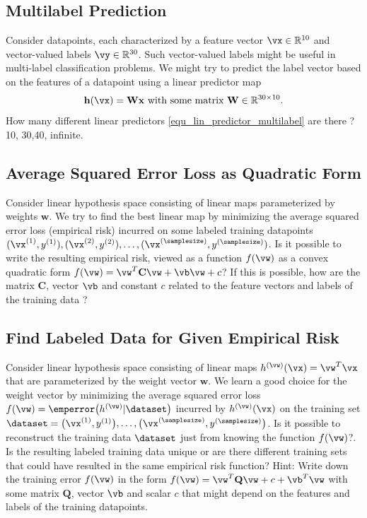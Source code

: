 \documentclass[12pt]{report}
\newcommand{\vh}{\mathbf{h}}
\begin{document}
\subsection{Multilabel Prediction} 
\label{ex_ch2_multilabel}
Consider datapoints, each characterized by a feature vector $\vx \in \mathbb{R}^{10}$ and 
vector-valued labels $\vy \in \mathbb{R}^{30}$. Such vector-valued labels might be useful 
in multi-label classification problems. We might try to predict the label vector based on the 
features of a datapoint using a linear predictor map 
\begin{equation}
\label{equ_lin_predictor_multilabel}
\vh(\vx) = \mathbf{W} \mathbf{x} \mbox{ with some matrix } \mathbf{W} \in \mathbb{R}^{30 \times 10}. 
\end{equation} 
How many different linear predictors \eqref{equ_lin_predictor_multilabel} are there ? 
10, 30,40, infinite. 




\subsection{Average Squared Error Loss as Quadratic Form} 
\label{ex_2_0}
Consider linear hypothesis space consisting of linear maps parameterized by 
weights $\mathbf{w}$. We try to find the best linear map by minimizing the average 
squared error loss (empirical risk) incurred on some labeled training datapoints 
$(\vx^{(1)},y^{(1)}),(\vx^{(2)},y^{(2)}),\ldots,(\vx^{(\samplesize)},y^{(\samplesize)})$.  
Is it possible to write the resulting empirical risk, viewed as a function $f(\vw)$ as 
a convex quadratic form $f(\vw) = \vw^{T} \mathbf{C} \vw + \vb \vw + c$? If this 
is possible, how are the matrix $\mathbf{C}$, vector $\vb$ and constant $c$ related 
to the feature vectors and labels of the training data ? 


\subsection{Find Labeled Data for Given Empirical Risk} 
\label{ex_2_1}
Consider linear hypothesis space consisting of linear maps $h^{(\vw)}(\vx) = \vw^{T} \vx$ that are 
parameterized by the weight vector $\mathbf{w}$. We learn a good choice for the weight vector by 
minimizing the average squared error loss $f(\vw) = \emperror \big( h^{(\vw)} | \dataset\big)$ 
incurred by $h^{(\vw)}(\vx)$ on the training set $\dataset = \big(\vx^{(1)},y^{(1)}\big),\ldots,\big(\vx^{(\samplesize)},y^{(\samplesize)}\big)$. 
Is it possible to reconstruct the training data $\dataset$ just from knowing the function $f(\vw)$?. 
Is the resulting labeled training data unique or are there different training sets that could have 
resulted in the same empirical risk function? 
Hint: Write down the training error $f(\vw)$ in the form $f(\vw) = \vw^{T} \mathbf{Q} \vw + c + \vb^{T} \vw$ 
with some matrix $\mathbf{Q}$, vector $\vb$ and scalar $c$ that might depend on 
the features and labels of the training datapoints. 
\end{document}

